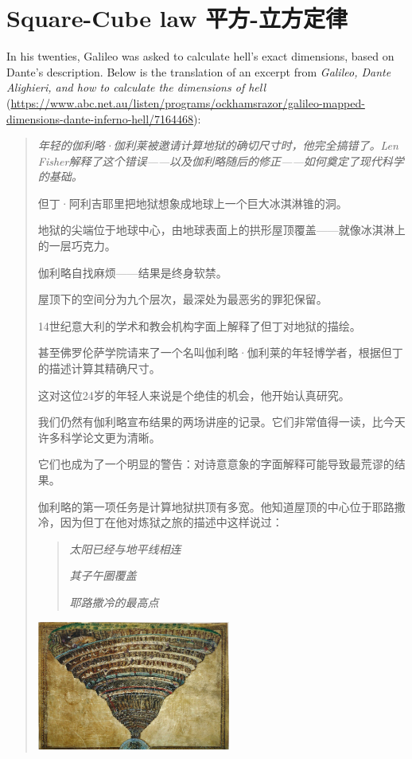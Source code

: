 \section{Square-Cube law
平方-立方定律}\label{square-cube-law-ux5e73ux65b9-ux7acbux65b9ux5b9aux5f8b}

In his twenties, Galileo was asked to calculate hell's exact dimensions, based on Dante's description. Below is the translation of an excerpt from \emph{Galileo, Dante Alighieri, and how to calculate the dimensions of hell} (\url{https://www.abc.net.au/listen/programs/ockhamsrazor/galileo-mapped-dimensions-dante-inferno-hell/7164468}):

\begin{quote}
    \emph{年轻的伽利略·伽利莱被邀请计算地狱的确切尺寸时，他完全搞错了。Len Fisher解释了这个错误——以及伽利略随后的修正——如何奠定了现代科学的基础。}
    
    但丁·阿利吉耶里把地狱想象成地球上一个巨大冰淇淋锥的洞。
    
    地狱的尖端位于地球中心，由地球表面上的拱形屋顶覆盖——就像冰淇淋上的一层巧克力。
    
    伽利略自找麻烦——结果是终身软禁。
    
    屋顶下的空间分为九个层次，最深处为最恶劣的罪犯保留。
    
    14世纪意大利的学术和教会机构字面上解释了但丁对地狱的描绘。
    
    甚至佛罗伦萨学院请来了一个名叫伽利略·伽利莱的年轻博学者，根据但丁的描述计算其精确尺寸。
    
    这对这位24岁的年轻人来说是个绝佳的机会，他开始认真研究。
    
    我们仍然有伽利略宣布结果的两场讲座的记录。它们非常值得一读，比今天许多科学论文更为清晰。
    
    它们也成为了一个明显的警告：对诗意意象的字面解释可能导致最荒谬的结果。
    
    伽利略的第一项任务是计算地狱拱顶有多宽。他知道屋顶的中心位于耶路撒冷，因为但丁在他对炼狱之旅的描述中这样说过：
    
    \begin{quote}
    \emph{太阳已经与地平线相连}
    
    \emph{其子午圈覆盖}
    
    \emph{耶路撒冷的最高点}
    \end{quote}
    
    \begin{center}
        \includegraphics[height=120pt]{assets/Picture_of_Hell.png}
    \end{center}
    

\end{quote}

